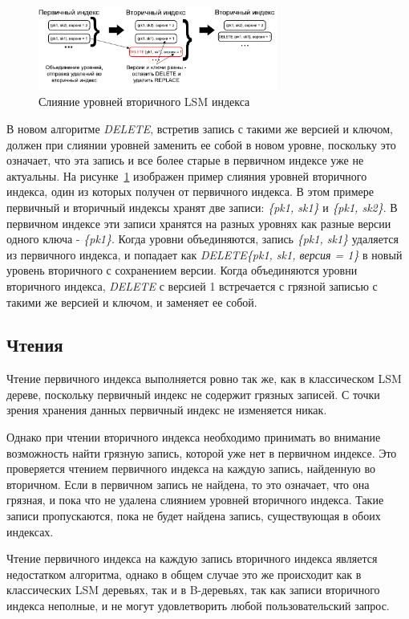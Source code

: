\documentclass[a4paper,hidelinks,12pt]{article}
\begin{document}
\begin{figure}
\centering
\includegraphics[width=0.7\textwidth]{secondary_compaction_example}
\caption{Слияние уровней вторичного LSM индекса}
\label{fig:secondary_compaction_example}
\end{figure}

В новом алгоритме \textit{DELETE}, встретив запись с такими же версией и ключом,
должен при слиянии уровней заменить ее собой в новом уровне, поскольку это
означает, что эта запись и все более старые в первичном индексе уже не
актуальны. На рисунке~\ref{fig:secondary_compaction_example} изображен пример
слияния уровней вторичного индекса, один из которых получен от первичного
индекса. В этом примере первичный и вторичный индексы хранят две записи:
\textit{\{pk1, sk1\}} и \textit{\{pk1, sk2\}}. В первичном индексе эти записи
хранятся на разных уровнях как разные версии одного ключа - \textit{\{pk1\}}.
Когда уровни объединяются, запись \textit{\{pk1, sk1\}} удаляется из первичного
индекса, и попадает как \textit {DELETE\{pk1, sk1, версия = 1\}} в новый уровень
вторичного с сохранением версии. Когда объединяются уровни вторичного индекса,
\textit{DELETE} с версией 1 встречается с грязной записью с такими же версией и
ключом, и заменяет ее собой.

\subsection{Чтения}
Чтение первичного индекса выполняется ровно так же, как в классическом LSM
дереве, поскольку первичный индекс не содержит грязных записей. С точки зрения
хранения данных первичный индекс не изменяется никак.

Однако при чтении вторичного индекса необходимо принимать во внимание
возможность найти грязную запись, которой уже нет в первичном индексе. Это
проверяется чтением первичного индекса на каждую запись, найденную во вторичном.
Если в первичном запись не найдена, то это означает, что она грязная, и пока что
не удалена слиянием уровней вторичного индекса. Такие записи пропускаются, пока
не будет найдена запись, существующая в обоих индексах.

Чтение первичного индекса на каждую запись вторичного индекса является
недостатком алгоритма, однако в общем случае это же происходит как в
классических LSM деревьях, так и в B-деревьях, так как записи вторичного индекса
неполные, и не могут удовлетворить любой пользовательский запрос.
\end{document}
